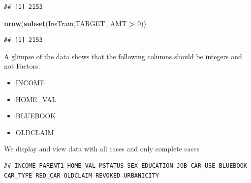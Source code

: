 \documentclass[]{article}
\newenvironment{Shaded}{\begin{snugshade}}{\end{snugshade}}
\newcommand{\KeywordTok}[1]{\textcolor[rgb]{0.13,0.29,0.53}{\textbf{#1}}}
\newcommand{\DecValTok}[1]{\textcolor[rgb]{0.00,0.00,0.81}{#1}}
\newcommand{\StringTok}[1]{\textcolor[rgb]{0.31,0.60,0.02}{#1}}
\newcommand{\OperatorTok}[1]{\textcolor[rgb]{0.81,0.36,0.00}{\textbf{#1}}}
\newcommand{\NormalTok}[1]{#1}
\providecommand{\tightlist}{%
  \setlength{\itemsep}{0pt}\setlength{\parskip}{0pt}}
\begin{document}
\begin{verbatim}
## [1] 2153
\end{verbatim}

\begin{Shaded}
\begin{Highlighting}[]
\KeywordTok{nrow}\NormalTok{(}\KeywordTok{subset}\NormalTok{(InsTrain,TARGET_AMT }\OperatorTok{>}\StringTok{ }\DecValTok{0}\NormalTok{))}
\end{Highlighting}
\end{Shaded}

\begin{verbatim}
## [1] 2153
\end{verbatim}

A glimpse of the data shows that the following columns should be
integers and not Factors:

\begin{itemize}
\tightlist
\item
  INCOME
\item
  HOME\_VAL
\item
  BLUEBOOK
\item
  OLDCLAIM
\end{itemize}

We display and view data with all cases and only complete cases

\begin{verbatim}
## INCOME PARENT1 HOME_VAL MSTATUS SEX EDUCATION JOB CAR_USE BLUEBOOK CAR_TYPE RED_CAR OLDCLAIM REVOKED URBANICITY
\end{verbatim}
\end{document}
